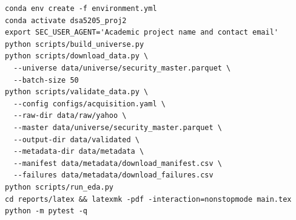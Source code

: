 
\begin{verbatim}
conda env create -f environment.yml
conda activate dsa5205_proj2
export SEC_USER_AGENT='Academic project name and contact email'
python scripts/build_universe.py
python scripts/download_data.py \
  --universe data/universe/security_master.parquet \
  --batch-size 50
python scripts/validate_data.py \
  --config configs/acquisition.yaml \
  --raw-dir data/raw/yahoo \
  --master data/universe/security_master.parquet \
  --output-dir data/validated \
  --metadata-dir data/metadata \
  --manifest data/metadata/download_manifest.csv \
  --failures data/metadata/download_failures.csv
python scripts/run_eda.py
cd reports/latex && latexmk -pdf -interaction=nonstopmode main.tex
python -m pytest -q
\end{verbatim}
